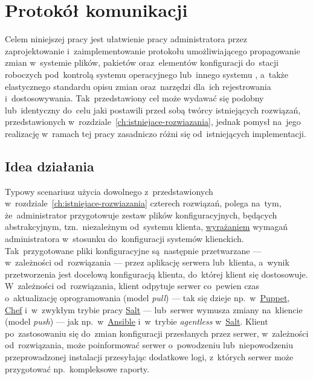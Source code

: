 \documentclass[thesis]{subfiles}
\begin{document}
\chapter{Protokół komunikacji}
\label{ch:protokol}

Celem niniejszej pracy jest ułatwienie pracy administratora przez zaprojektowanie i~zaimplementowanie protokołu umożliwiającego propagowanie zmian w~systemie plików, pakietów oraz~elementów konfiguracji do~stacji roboczych pod~kontrolą systemu operacyjnego  lub~innego systemu , a~także elastycznego standardu opisu zmian oraz~narzędzi dla~ich rejestrowania i~dostosowywania. Tak~przedstawiony cel może wydawać się podobny lub~identyczny do~celu jaki postawili przed sobą twórcy istniejących rozwiązań, przedstawionych w~rozdziale~\ref{ch:istniejace-rozwiazania}, jednak pomysł na~jego realizację w~ramach tej pracy zasadniczo różni się od~istniejących implementacji.


\section{Idea działania}

Typowy scenariusz użycia dowolnego z~przedstawionych w~rozdziale~\ref{ch:istniejace-rozwiazania} czterech rozwiązań, polega na~tym, że~administrator przygotowuje zestaw plików konfiguracyjnych, będących abstrakcyjnym, tzn.~niezależnym od~systemu klienta, \href{https://martinfowler.com/bliki/DomainSpecificLanguage.html}{wyrażaniem} wymagań administratora w~stosunku do~konfiguracji systemów klienckich. Tak~przygotowane pliki konfiguracyjne są~następnie przetwarzane --- w~zależności od~rozwiązania --- przez aplikację serwera lub~klienta, a~wynik przetworzenia jest docelową konfiguracją klienta, do~której klient się dostosowuje. W~zależności od~rozwiązania, klient odpytuje serwer co~pewien czas o~aktualizację oprogramowania (model \emph{pull}) --- tak się dzieje np.~w~\hyperref[sec:puppet]{Puppet}, \hyperref[sec:chef]{Chef} i~w~zwykłym trybie pracy \hyperref[sec:salt]{Salt} --- lub~serwer wymusza zmiany na~kliencie (model \emph{push}) --- jak np.~w~\hyperref[sec:ansible]{Ansible} i~w~trybie \emph{agentless} w~\hyperref[sec:salt]{Salt}. Klient po~zastosowaniu się do~zmian konfiguracji przesłanych przez serwer, w~zależności od~rozwiązania, może poinformować serwer o~powodzeniu lub~niepowodzeniu przeprowadzonej instalacji przesyłając dodatkowe logi, z~których serwer może przygotować np.~kompleksowe raporty.
\end{document}
